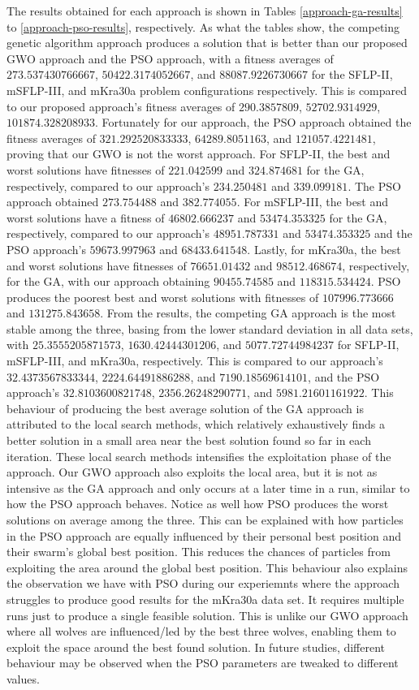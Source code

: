 The results obtained for each approach is shown in Tables \ref{approach-ga-results} to \ref{approach-pso-results}, respectively. As what the tables show, the competing genetic algorithm approach produces a solution that is better than our proposed GWO approach and the PSO approach, with a fitness averages of $273.537430766667$, $50422.3174052667$, and $88087.9226730667$ for the SFLP-II, mSFLP-III, and mKra30a problem configurations respectively. This is compared to our proposed approach's fitness averages of $290.3857809$, $52702.9314929$, $101874.328208933$. Fortunately for our approach, the PSO approach obtained the fitness averages of $321.292520833333$, $64289.8051163$, and $121057.4221481$, proving that our GWO is not the worst approach. For SFLP-II, the best and worst solutions have fitnesses of $221.042599$ and $324.874681$ for the GA, respectively, compared to our approach's $234.250481$ and $339.099181$. The PSO approach obtained $273.754488$ and $382.774055$. For mSFLP-III, the best and worst solutions have a fitness of $46802.666237$ and $53474.353325$ for the GA, respectively, compared to our approach's $48951.787331$ and $53474.353325$ and the PSO approach's $59673.997963$ and $68433.641548$. Lastly, for mKra30a, the best and worst solutions have fitnesses of $76651.01432$ and $98512.468674$, respectively, for the GA, with our approach obtaining $90455.74585$ and $118315.534424$. PSO produces the poorest best and worst solutions with fitnesses of $107996.773666$ and $131275.843658$. From the results, the competing GA approach is the most stable among the three, basing from the lower standard deviation in all data sets, with $25.3555205871573$, $1630.42444301206$, and $5077.72744984237$ for SFLP-II, mSFLP-III, and mKra30a, respectively. This is compared to our approach's $32.4373567833344$, $2224.64491886288$, and $7190.18569614101$, and the PSO approach's $32.8103600821748$, $2356.26248290771$, and $5981.21601161922$. This behaviour of producing the best average solution of the GA approach is attributed to the local search methods, which relatively exhaustively finds a better solution in a small area near the best solution found so far in each iteration. These local search methods intensifies the exploitation phase of the approach. Our GWO approach also exploits the local area, but it is not as intensive as the GA approach and only occurs at a later time in a run, similar to how the PSO approach behaves. Notice as well how PSO produces the worst solutions on average among the three. This can be explained with how particles in the PSO approach are equally influenced by their personal best position and their swarm's global best position. This reduces the chances of particles from exploiting the area around the global best position. This behaviour also explains the observation we have with PSO during our experiemnts where the approach struggles to produce good results for the mKra30a data set. It requires multiple runs just to produce a single feasible solution. This is unlike our GWO approach where all wolves are influenced/led by the best three wolves, enabling them to exploit the space around the best found solution. In future studies, different behaviour may be observed when the PSO parameters are tweaked to different values.

